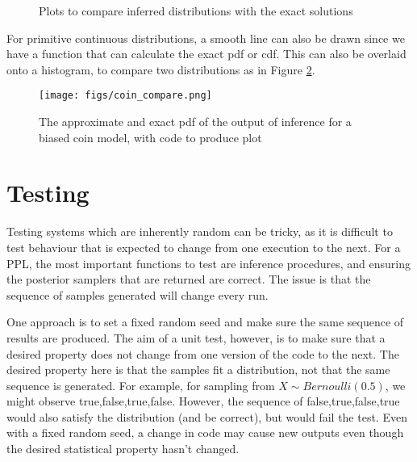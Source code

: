 \documentclass[sigconf]{acmart}
\begin{document}
\begin{figure}[!htb]
  \centering
  \qquad
  \caption{Plots to compare inferred distributions with the exact solutions}
  \label{fig:vis-qq}
\end{figure}

For primitive continuous distributions, a smooth line can also be drawn since we have a function that can calculate the exact pdf or cdf. This can also be overlaid onto a histogram, to compare two distributions as in Figure \ref{fig:vis-samples}.

\begin{figure}[!htb]
  \centering
  \begin{minipage}{0.45\textwidth}
    \centering
  \end{minipage}
  \begin{minipage}{0.45\textwidth}
    \centering
    \texttt{[image: figs/coin\_compare.png]}
  \end{minipage}
  \caption{The approximate and exact pdf of the output of inference for a biased coin model, with code to produce plot}
  \label{fig:vis-samples}
\end{figure}


\section{Testing}\label{sec:impl-testing}

Testing systems which are inherently random can be tricky, as it is difficult to test behaviour that is expected to change from one execution to the next. For a PPL, the most important functions to test are inference procedures, and ensuring the posterior samplers that are returned are correct. The issue is that the sequence of samples generated will change every run.

One approach is to set a fixed random seed and make sure the same sequence of results are produced. The aim of a unit test, however, is to make sure that a desired property does not change from one version of the code to the next. The desired property here is that the samples fit a distribution, not that the same sequence is generated. For example, for sampling from $X \sim Bernoulli(0.5)$, we might observe true,false,true,false. However, the sequence of false,true,false,true would also satisfy the distribution (and be correct), but would fail the test. Even with a fixed random seed, a change in code may cause new outputs even though the desired statistical property hasn't changed.
\end{document}
